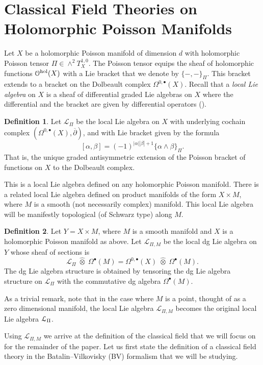 \documentclass[11pt, oneside, reqno]{amsart}
\theoremstyle{definition} \newtheorem{definition}{Definition}[section]
\theoremstyle{definition}
\theoremstyle{remark}
\theoremstyle{definition} \newtheorem{remark}[definition]{Remark}
\theoremstyle{definition} \newtheorem{remarks}[definition]{Remarks}
\theoremstyle{definition} \newtheorem{question}[definition]{Question}
\theoremstyle{definition} \newtheorem*{note}{Note}
\theoremstyle{definition} \newtheorem{example}[definition]{Example}
\theoremstyle{definition} \newtheorem{examples}[definition]{Examples}
\def\bu{\bullet}
\def\Hat{\widehat}
\newcommand{\dd}{\partial}
\newcommand{\mr}[1]{\mathrm{#1}}
\newcommand{\mc}[1]{\mathcal{#1}}
\newcommand{\ol}[1]{\overline{#1}}
\begin{document}
\section{Classical Field Theories on Holomorphic Poisson Manifolds}
Let $X$ be a holomorphic Poisson manifold of dimension $d$ with holomorphic Poisson tensor $\Pi \in \wedge^2 T^{1,0}_X$.  
The Poisson tensor equips the sheaf of holomorphic functions $\cO^{\mr{hol}}(X)$ with a Lie bracket that we denote by $\{-,-\}_\Pi$. 
This bracket extends to a bracket on the Dolbeault complex $\Omega^{0,\bu}(X)$.  Recall that a \emph{local Lie algebra} on $X$ is a sheaf of differential graded Lie algebras on $X$ where the differential and the bracket are given by differential operators (\cite[Section 6.2]{Book1}).

\begin{definition}\label{dfn:localLie1}
Let $\mc L_{\Pi}$ be the local Lie algebra on $X$ with underlying cochain complex $(\Omega^{0,\bullet}(X), \ol \dd)$, and with Lie bracket given by the formula 
\[[\alpha, \beta] = (-1)^{|\alpha||\beta| +1} \{\alpha \wedge \beta\}_\Pi .\]
That is, the unique graded antisymmetric extension of the Poisson bracket of functions on $X$ to the Dolbeault complex. 
\end{definition}

This is a local Lie algebra defined on any holomorphic Poisson manifold. There is a related local Lie algebra defined on product manifolds of the form $X \times M$, where $M$ is a smooth (not necessarily complex) manifold. This local Lie algebra will be manifestly topological (of Schwarz type) along $M$.

\begin{definition}
Let $Y = X \times M$, where $M$ is a smooth manifold and $X$ is a holomorphic Poisson manifold as above.  
Let $\mc L_{\Pi,M}$ be the local dg Lie algebra on $Y$ whose sheaf of sections is
\[
\mc L_\Pi \; \Hat{\otimes} \; \Omega^\bu(M) = \Omega^{0,\bu}(X) \; \Hat{\otimes}\; \Omega^\bu(M).
\]
The dg Lie algebra structure is obtained by tensoring the dg Lie algebra structure on $\mc L_\Pi$ with the commutative dg algebra $\Omega^\bu(M)$.  
\end{definition}

As a trivial remark, note that in the case where $M$ is a point, thought of as a zero dimensional manifold, the local Lie algebra $\mc L_{\Pi,M}$ becomes the original local Lie algebra $\mathcal L_\Pi$. 

Using $\mc L_{\Pi,M}$ we arrive at the definition of the classical field that we will focus on for the remainder of the paper.  Let us first state the definition of a classical field theory in the Batalin--Vilkovisky (BV) formalism \cite{BatalinVilkovisky} that we will be studying.
\end{document}
